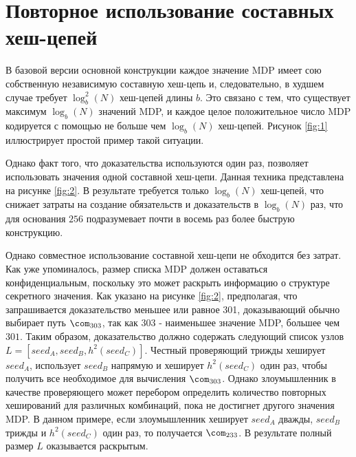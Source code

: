 \section{Повторное использование составных хеш-цепей} %
В базовой версии основной конструкции каждое значение MDP имеет сою собственную независимую составную хеш-цепь и, следовательно, в худшем случае требует $\log^2_b(N)$ хеш-цепей длины $b$.
Это связано с тем, что существует максимум $\log_b(N)$ значений MDP, и каждое целое положительное число MDP кодируется с помощью не больше чем $\log_b(N)$ хеш-цепей.
Рисунок \ref{fig:1} иллюстрирует простой пример такой ситуации.

\begin{tikzpicture}[node distance=1.5cm]
	\label{fig:1}
\end{tikzpicture}

Однако факт того, что доказательства используются один раз, позволяет использовать значения одной составной хеш-цепи.
Данная техника представлена на рисунке \ref{fig:2}.
В результате требуется только $\log_b(N)$ хеш-цепей, что снижает затраты на создание обязательств и доказательств в $\log_b(N)$ раз, что для основания $256$ подразумевает почти в восемь раз более быструю конструкцию.

\begin{tikzpicture}[node distance=1.5cm]
	\label{fig:2}
\end{tikzpicture}

Однако совместное использование составной хеш-цепи не обходится без затрат.
Как уже упоминалось, размер списка MDP должен оставаться конфиденциальным, поскольку это может раскрыть информацию о структуре секретного значения.
Как указано на рисунке \ref{fig:2}, предполагая, что запрашивается доказательство меньшее или равное 301, доказывающий обычно выбирает путь $\com_{303}$, так как $303$ - наименьшее значение MDP, большее чем $301$.
Таким образом, доказательство должно содержать следующий список узлов $L = [seed_A, seed_B, h^2(seed_C)]$.
Честный проверяющий трижды хеширует $seed_A$, использует $seed_B$ напрямую и хеширует $h^2(seed_C)$ один раз, чтобы получить все необходимое для вычисления $\com_{303}$.
Однако злоумышленник в качестве проверяющего может перебором определить количество повторных хеширований для различных комбинаций, пока не достигнет другого значения MDP.
В данном примере, если злоумышленник хеширует $seed_A$ дважды, $seed_B$ трижды и $h^2(seed_C)$ один раз, то получается $\com_{233}$.
В результате полный размер $L$ оказывается раскрытым.

